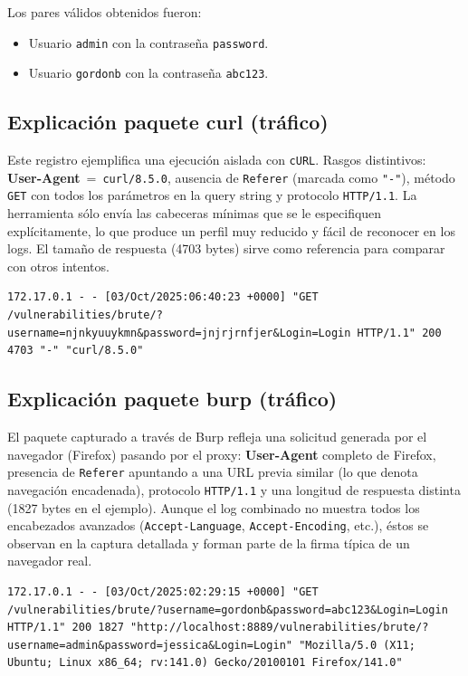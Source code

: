 \documentclass[letterpaper,12pt]{article}
\let\origsubsection\subsection
\renewcommand{\subsection}{\FloatBarrier\origsubsection}
\begin{document}
Los pares válidos obtenidos fueron:
\begin{itemize}
        \item Usuario \texttt{admin} con la contraseña \texttt{password}.
        \item Usuario \texttt{gordonb} con la contraseña \texttt{abc123}.
\end{itemize}


\subsection{Explicación paquete curl (tráfico)}
Este registro ejemplifica una ejecución aislada con \texttt{cURL}. Rasgos distintivos: \textbf{User-Agent}\ =\ \texttt{curl/8.5.0}, ausencia de \texttt{Referer} (marcada como \texttt{"-"}), método \texttt{GET} con todos los parámetros en la query string y protocolo \texttt{HTTP/1.1}. La herramienta sólo envía las cabeceras mínimas que se le especifiquen explícitamente, lo que produce un perfil muy reducido y fácil de reconocer en los logs. El tamaño de respuesta (4703 bytes) sirve como referencia para comparar con otros intentos.
\begin{verbatim}
172.17.0.1 - - [03/Oct/2025:06:40:23 +0000] "GET /vulnerabilities/brute/?username=njnkyuuykmn&password=jnjrjrnfjer&Login=Login HTTP/1.1" 200 4703 "-" "curl/8.5.0"
\end{verbatim}
\subsection{Explicación paquete burp (tráfico)}
El paquete capturado a través de Burp refleja una solicitud generada por el navegador (Firefox) pasando por el proxy: \textbf{User-Agent} completo de Firefox, presencia de \texttt{Referer} apuntando a una URL previa similar (lo que denota navegación encadenada), protocolo \texttt{HTTP/1.1} y una longitud de respuesta distinta (1827 bytes en el ejemplo). Aunque el log combinado no muestra todos los encabezados avanzados (\texttt{Accept-Language}, \texttt{Accept-Encoding}, etc.), éstos se observan en la captura detallada y forman parte de la firma típica de un navegador real.
\begin{verbatim}
172.17.0.1 - - [03/Oct/2025:02:29:15 +0000] "GET /vulnerabilities/brute/?username=gordonb&password=abc123&Login=Login HTTP/1.1" 200 1827 "http://localhost:8889/vulnerabilities/brute/?username=admin&password=jessica&Login=Login" "Mozilla/5.0 (X11; Ubuntu; Linux x86_64; rv:141.0) Gecko/20100101 Firefox/141.0"
\end{verbatim}
\end{document}
